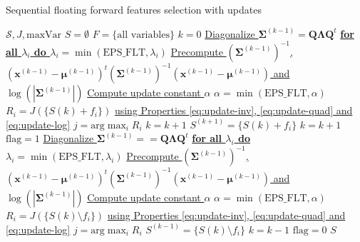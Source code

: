 \documentclass[a4paper,11pt,DIV=16]{scrartcl}
\begin{document}
        \begin{algorithm}
        \caption{Sequential floating forward features selection with updates\label{alg:sffs-update}}
        {\fontsize{8}{8}\selectfont
        \begin{algorithmic}[1]
        \REQUIRE $\mathcal{S},J,\text{maxVar}$
        \STATE $S=\emptyset$
        \STATE $F=\text{\{all variables\}}$
        \STATE $k=0$
        \STATE \underline{Diagonalize $\boldsymbol{\Sigma}^{(k-1)} = \mathbf{Q} \boldsymbol{\Lambda} \mathbf{Q}^t$}
        \STATE \underline{\bfseries{for all} $\lambda_i$ \bfseries{do} $\lambda_i = \min (\text{EPS\_FLT},\lambda_i)$}
        \STATE \underline{Precompute $(\boldsymbol{\Sigma}^{(k-1)})^{-1}$, $(\mathbf{x}^{(k-1)} - \boldsymbol{\mu}^{(k-1)})^t (\boldsymbol{\Sigma}^{(k-1)})^{-1} (\mathbf{x}^{(k-1)} - \boldsymbol{\mu}^{(k-1)})$ and $\log \left(|\boldsymbol{\Sigma}^{(k-1)}|\right)$}
        \STATE \underline{Compute update constant $\alpha$}
        \STATE \underline{$\alpha = \min (\text{EPS\_FLT},\alpha)$}
        \STATE $R_i = J(\{S{(k)} + f_i\})$ \underline{using Properties \ref{eq:update-inv}, \ref{eq:update-quad} and \ref{eq:update-log}}
        \ENDFOR
        \STATE $j=\text{arg} \max_{i} R_i$
        \STATE $k=k+1$
        \ELSE
        \STATE $S^{(k+1)} = \{S{(k)} + f_i\}$
        \STATE $k=k+1$
        \STATE $\text{flag}=1$
        \STATE \underline{Diagonalize $\boldsymbol{\Sigma}^{(k-1)} = = \mathbf{Q} \boldsymbol{\Lambda} \mathbf{Q}^t$}
        \STATE \underline{\bfseries{for all} $\lambda_i$ \bfseries{do} $\lambda_i = \min (\text{EPS\_FLT},\lambda_i)$}
        \STATE \underline{Precompute $(\boldsymbol{\Sigma}^{(k-1)})^{-1}$, $(\mathbf{x}^{(k-1)} - \boldsymbol{\mu}^{(k-1)})^t (\boldsymbol{\Sigma}^{(k-1)})^{-1} (\mathbf{x}^{(k-1)} - \boldsymbol{\mu}^{(k-1)})$ and $\log \left(|\boldsymbol{\Sigma}^{(k-1)}|\right)$}
        \STATE \underline{Compute update constant $\alpha$}
        \STATE \underline{$\alpha = \min (\text{EPS\_FLT},\alpha)$}
        \STATE $R_i = J(\{S{(k)}\setminus f_i\})$ \underline{using Properties \ref{eq:update-inv}, \ref{eq:update-quad} and \ref{eq:update-log}}
        \ENDFOR
        \STATE $j=\text{arg} \max_{i} R_i$
        \STATE $S^{(k-1)} = \{S{(k)} \setminus f_i\}$
        \STATE $k=k-1$
        \ELSE
        \STATE $\text{flag}=0$
        \ENDIF
        \ENDWHILE
        \ENDIF
        \ENDWHILE
        \RETURN $S$
        \end{algorithmic}
        }
        \end{algorithm}
\end{document}
